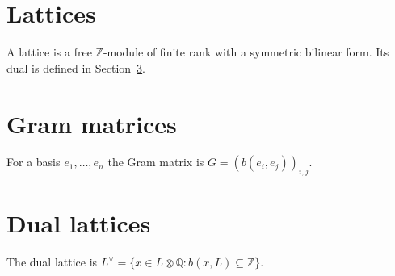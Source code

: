\documentclass{article}
\begin{document}
\section{Lattices}
A lattice is a free $\mathbb{Z}$-module of finite rank with a symmetric bilinear form.
Its dual is defined in Section~\ref{dual}.
\newpage
\section{Gram matrices}
For a basis $e_1, \dots, e_n$ the Gram matrix is $G = (b(e_i, e_j))_{i,j}$.
\newpage
\section{Dual lattices}\label{dual}
The dual lattice is $L^\vee = \{ x \in L \otimes \mathbb{Q} : b(x, L) \subseteq \mathbb{Z} \}$.
\end{document}
